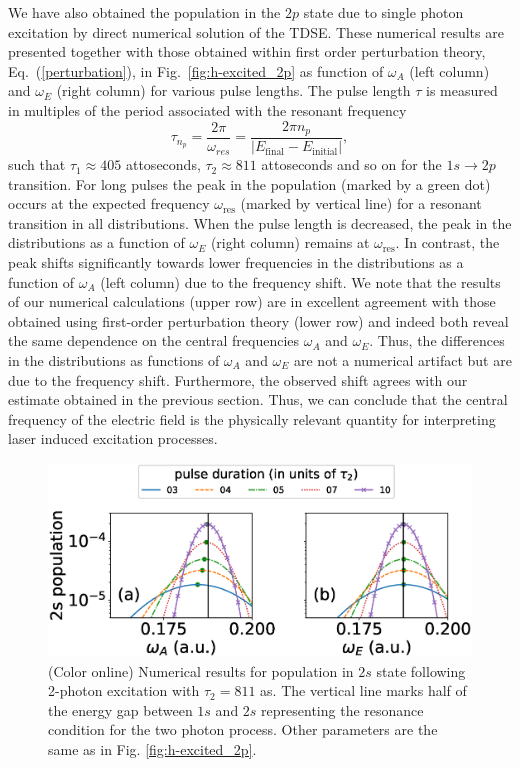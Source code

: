 We have also obtained the population in the $2p$ state due to single photon excitation by direct numerical solution of the TDSE. These numerical results are presented together with those obtained within first order perturbation theory, Eq.~(\ref{perturbation}), in Fig.~\ref{fig:h-excited_2p} as function of $\omega_A$ (left column) and $\omega_E$ (right column) for various pulse lengths. The pulse length $\tau$ is measured in multiples of the period associated with the resonant frequency
\begin{equation}
\tau_{n_p} = \frac{2\pi}{\omega_{res}} = \frac{2\pi n_p}{|E_\text{final}-E_\text{initial}|},
\end{equation}
such that $\tau_1\approx 405$ attoseconds, $\tau_2 \approx 811$ attoseconds and so on for the $1s \rightarrow 2p$ transition. For long pulses the peak in the population (marked by a green dot) occurs at the expected frequency $\omega_\text{res}$ (marked by vertical line) for a resonant transition in all distributions. When the pulse length is decreased, the peak in the distributions as a function of $\omega_E$ (right column) remains at $\omega_\text{res}$. In contrast, the peak shifts significantly towards lower frequencies in the distributions as a function of $\omega_A$ (left column) due to the frequency shift. We note that the results of our numerical calculations (upper row) are in excellent agreement with those obtained using first-order perturbation theory (lower row) and indeed both reveal the same dependence on the central frequencies $\omega_A$ and $\omega_E$. Thus, the differences in the distributions as functions of $\omega_A$ and $\omega_E$ are not a numerical artifact but are due to the frequency shift. Furthermore, the observed shift agrees with our estimate obtained in the previous section. Thus, we can conclude that the central frequency of the electric field is the physically relevant quantity for interpreting laser induced excitation processes.


\begin{figure}[t]
\centering
       \includegraphics[width=\linewidth]{figs/Frequency_shift/2s_population_comb.eps}
\caption{(Color online)
Numerical results for population in $2s$ state following 2-photon excitation with $\tau_2=811$ as. The vertical line marks half of the energy gap between $1s$ and $2s$ representing the resonance condition for the two photon process. Other parameters are the same as in Fig. \ref{fig:h-excited_2p}.
}
  \label{fig:h-excited_2s}
\end{figure}

